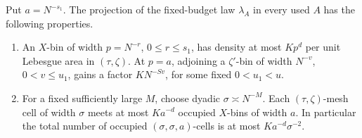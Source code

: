 \begin{lemma}
 \label{a08:projected-bounds}
 Put \(a=N^{-s_1}\).  The projection of the fixed-budget law
 \(\lambda_A\) in every used \(A\) has the following properties.
 \begin{enumerate}
  \item An \(X\)-bin of width \(p=N^{-r}\), \(0\le r\le s_1\), has
  density at most \(Kp^d\) per unit Lebesgue area in \((\tau,\zeta)\).
  At \(p=a\), adjoining a \(\zeta'\)-bin of width \(N^{-v}\),
  \(0<v\le u_1\), gains a factor \(KN^{-Sv}\), for some fixed
  \(0<u_1<u\).
  \item For a fixed sufficiently large \(M\), choose dyadic
  \(\sigma\asymp N^{-M}\).  Each \((\tau,\zeta)\)-mesh cell of width
  \(\sigma\) meets at most \(Ka^{-d}\) occupied \(X\)-bins of width
  \(a\).  In particular the total number of occupied
  \((\sigma,\sigma,a)\)-cells is at most
  \(Ka^{-d}\sigma^{-2}\).
 \end{enumerate}
\end{lemma}

